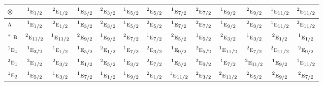 \documentclass[10pt,a4paper]{article}
\numberwithin{equation}{section}
\newcommand{\irr}[1]{\text{\normalfont\scshape #1}}
\newcommand{\conjpair}[1]{{}^{#1}}
\newcommand{\irrprod}{\otimes}
\begin{document}
{\small\setlength{\tabcolsep}{3pt}\begin{longtable}{@{}lcccccccccccc@{}}\toprule
$\irrprod$ & $\conjpair{1}\irr{e}_{1/2}$ & $\conjpair{2}\irr{e}_{1/2}$ & $\conjpair{1}\irr{e}_{3/2}$ & $\conjpair{2}\irr{e}_{3/2}$ & $\conjpair{1}\irr{e}_{5/2}$ & $\conjpair{2}\irr{e}_{5/2}$ & $\conjpair{1}\irr{e}_{7/2}$ & $\conjpair{2}\irr{e}_{7/2}$ & $\conjpair{1}\irr{e}_{9/2}$ & $\conjpair{2}\irr{e}_{9/2}$ & $\conjpair{1}\irr{e}_{11/2}$ & $\conjpair{2}\irr{e}_{11/2}$\\\midrule\endhead
\bottomrule\endfoot\endlastfoot
$\irr{a}$ & $\conjpair{1}\irr{e}_{1/2}$ & $\conjpair{2}\irr{e}_{1/2}$ & $\conjpair{1}\irr{e}_{3/2}$ & $\conjpair{2}\irr{e}_{3/2}$ & $\conjpair{1}\irr{e}_{5/2}$ & $\conjpair{2}\irr{e}_{5/2}$ & $\conjpair{1}\irr{e}_{7/2}$ & $\conjpair{2}\irr{e}_{7/2}$ & $\conjpair{1}\irr{e}_{9/2}$ & $\conjpair{2}\irr{e}_{9/2}$ & $\conjpair{1}\irr{e}_{11/2}$ & $\conjpair{2}\irr{e}_{11/2}$\\*
$\irr{b}$ & $\conjpair{2}\irr{e}_{11/2}$ & $\conjpair{1}\irr{e}_{11/2}$ & $\conjpair{2}\irr{e}_{9/2}$ & $\conjpair{1}\irr{e}_{9/2}$ & $\conjpair{2}\irr{e}_{7/2}$ & $\conjpair{1}\irr{e}_{7/2}$ & $\conjpair{2}\irr{e}_{5/2}$ & $\conjpair{1}\irr{e}_{5/2}$ & $\conjpair{2}\irr{e}_{3/2}$ & $\conjpair{1}\irr{e}_{3/2}$ & $\conjpair{2}\irr{e}_{1/2}$ & $\conjpair{1}\irr{e}_{1/2}$\\
$\conjpair{1}\irr{e}_{1}$ & $\conjpair{1}\irr{e}_{3/2}$ & $\conjpair{1}\irr{e}_{1/2}$ & $\conjpair{1}\irr{e}_{5/2}$ & $\conjpair{2}\irr{e}_{1/2}$ & $\conjpair{1}\irr{e}_{7/2}$ & $\conjpair{2}\irr{e}_{3/2}$ & $\conjpair{1}\irr{e}_{9/2}$ & $\conjpair{2}\irr{e}_{5/2}$ & $\conjpair{1}\irr{e}_{11/2}$ & $\conjpair{2}\irr{e}_{7/2}$ & $\conjpair{2}\irr{e}_{11/2}$ & $\conjpair{2}\irr{e}_{9/2}$\\
$\conjpair{2}\irr{e}_{1}$ & $\conjpair{2}\irr{e}_{1/2}$ & $\conjpair{2}\irr{e}_{3/2}$ & $\conjpair{1}\irr{e}_{1/2}$ & $\conjpair{2}\irr{e}_{5/2}$ & $\conjpair{1}\irr{e}_{3/2}$ & $\conjpair{2}\irr{e}_{7/2}$ & $\conjpair{1}\irr{e}_{5/2}$ & $\conjpair{2}\irr{e}_{9/2}$ & $\conjpair{1}\irr{e}_{7/2}$ & $\conjpair{2}\irr{e}_{11/2}$ & $\conjpair{1}\irr{e}_{9/2}$ & $\conjpair{1}\irr{e}_{11/2}$\\
$\conjpair{1}\irr{e}_{2}$ & $\conjpair{1}\irr{e}_{5/2}$ & $\conjpair{1}\irr{e}_{3/2}$ & $\conjpair{1}\irr{e}_{7/2}$ & $\conjpair{1}\irr{e}_{1/2}$ & $\conjpair{1}\irr{e}_{9/2}$ & $\conjpair{2}\irr{e}_{1/2}$ & $\conjpair{1}\irr{e}_{11/2}$ & $\conjpair{2}\irr{e}_{3/2}$ & $\conjpair{2}\irr{e}_{11/2}$ & $\conjpair{2}\irr{e}_{5/2}$ & $\conjpair{2}\irr{e}_{9/2}$ & $\conjpair{2}\irr{e}_{7/2}$\\

\end{longtable}}
\end{document}
